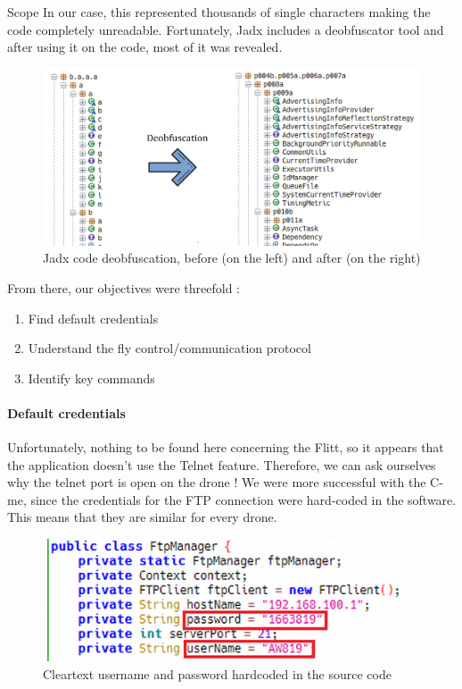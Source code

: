 \begin{chaptercover}{Scope}
In our case, this represented thousands of single characters making the code completely unreadable. Fortunately, Jadx includes a deobfuscator tool and after using it on the code, most of it was revealed.

\begin{figure}[H]
  \centering
  \includegraphics[width=.8\linewidth]{figures/apk-source-deobfuscation}
  \caption{Jadx code deobfuscation, before (on the left) and after (on the right)}
\end{figure}

From there, our objectives were threefold :

\begin{enumerate}
  \item Find default credentials
  \item Understand the fly control/communication protocol
  \item Identify key commands
\end{enumerate}

\paragraph{Default credentials} Unfortunately, nothing to be found here concerning the Flitt, so it appears that the application doesn’t use the Telnet feature. Therefore, we can ask ourselves why the telnet port is open on the drone ! We were more successful with the C-me, since the credentials for the FTP connection were hard-coded in the software. This means that they are similar for every drone.

\begin{figure}[H]
  \centering
  \includegraphics[width=.5\linewidth]{figures/apk-source-with-password}
  \caption{Cleartext username and password hardcoded in the source code}
\end{figure}


\end{chaptercover}
